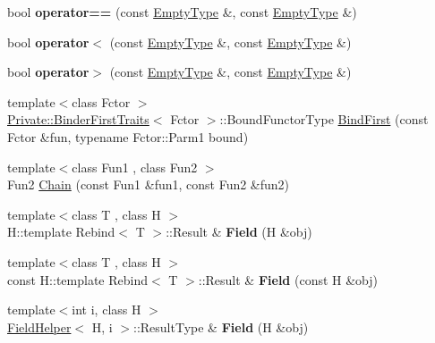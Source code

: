 \begin{DoxyCompactItemize}
\item 
\hypertarget{namespaceLoki_af3edcfef5331945667c3719de05e9020}{}bool {\bfseries operator==} (const \hyperlink{classLoki_1_1EmptyType}{Empty\+Type} \&, const \hyperlink{classLoki_1_1EmptyType}{Empty\+Type} \&)\label{namespaceLoki_af3edcfef5331945667c3719de05e9020}

\item 
\hypertarget{namespaceLoki_ad91ee07d8b5f298cdca793871da9bac0}{}bool {\bfseries operator$<$} (const \hyperlink{classLoki_1_1EmptyType}{Empty\+Type} \&, const \hyperlink{classLoki_1_1EmptyType}{Empty\+Type} \&)\label{namespaceLoki_ad91ee07d8b5f298cdca793871da9bac0}

\item 
\hypertarget{namespaceLoki_aa21c33cdc3448e1dc4c7c657e78dc11f}{}bool {\bfseries operator$>$} (const \hyperlink{classLoki_1_1EmptyType}{Empty\+Type} \&, const \hyperlink{classLoki_1_1EmptyType}{Empty\+Type} \&)\label{namespaceLoki_aa21c33cdc3448e1dc4c7c657e78dc11f}

\item 
{\footnotesize template$<$class Fctor $>$ }\\\hyperlink{structLoki_1_1Private_1_1BinderFirstTraits}{Private\+::\+Binder\+First\+Traits}$<$ Fctor $>$\+::Bound\+Functor\+Type \hyperlink{group__FunctorGroup_ga94fba0f3868956b6abd10227a8b60f91}{Bind\+First} (const Fctor \&fun, typename Fctor\+::\+Parm1 bound)
\item 
{\footnotesize template$<$class Fun1 , class Fun2 $>$ }\\Fun2 \hyperlink{group__FunctorGroup_gac17424df361130d56a783346a0fea152}{Chain} (const Fun1 \&fun1, const Fun2 \&fun2)
\item 
\hypertarget{namespaceLoki_af2bd27cdb76e748f349f925a8dea97d8}{}{\footnotesize template$<$class T , class H $>$ }\\H\+::template Rebind$<$ T $>$\+::Result \& {\bfseries Field} (H \&obj)\label{namespaceLoki_af2bd27cdb76e748f349f925a8dea97d8}

\item 
\hypertarget{namespaceLoki_ada7ce91208c764577e410dbc45eb7e32}{}{\footnotesize template$<$class T , class H $>$ }\\const H\+::template Rebind$<$ T $>$\+::Result \& {\bfseries Field} (const H \&obj)\label{namespaceLoki_ada7ce91208c764577e410dbc45eb7e32}

\item 
\hypertarget{namespaceLoki_a16d428a19b5f674326b3204975cb66d6}{}{\footnotesize template$<$int i, class H $>$ }\\\hyperlink{structLoki_1_1FieldHelper}{Field\+Helper}$<$ H, i $>$\+::Result\+Type \& {\bfseries Field} (H \&obj)\label{namespaceLoki_a16d428a19b5f674326b3204975cb66d6}


\end{DoxyCompactItemize}
